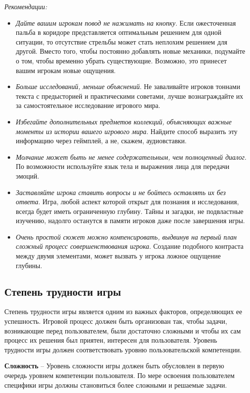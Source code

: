 \documentclass{article}
\begin{document}
\noindent\textit{Рекомендации:}
\begin{itemize}
  \item \textit{Дайте вашим игрокам повод не нажимать на кнопку}. Если ожесточенная пальба в коридоре представляется оптимальным решением для одной ситуации, то отсутствие стрельбы может стать неплохим решением для другой. Вместо того, чтобы постоянно добавлять новые механики, подумайте о том, чтобы временно убрать существующие. Возможно, это принесет вашим игрокам новые ощущения.
  \item \textit{Больше исследований, меньше объяснений}. Не заваливайте игроков тоннами текста с предысторией и практическими советами, лучше вознаграждайте их за самостоятельное исследование игрового мира.
  \item \textit{Избегайте дополнительных предметов коллекций, объясняющих важные моменты из истории вашего игрового мира}. Найдите способ выразить эту информацию через геймплей, а не, скажем, аудиовставки.
  \item \textit{Молчание может быть не менее содержательным, чем полноценный диалог}. По возможности используйте язык тела и выражения лица для передачи эмоций.
  \item \textit{Заставляйте игрока ставить вопросы и не бойтесь оставлять их без ответа}. Игра, любой аспект которой открыт для познания и исследования, всегда будет иметь ограниченную глубину. Тайны и загадки, не подвластные изучению, надолго останутся в памяти игроков даже после завершения игры.
  \item \textit{Очень простой сюжет можно компенсировать, выдвинув на первый план сложный процесс совершенствования игрока}. Создание подобного контраста между двумя элементами, может вызвать у игрока ложное ощущение глубины.
\end{itemize}

\subsection{Степень трудности игры}
Степень трудности игры является одним из важных факторов, определяющих ее успешность. Игровой процесс должен быть организован так, чтобы задачи, возникающие перед пользователем, были достаточно сложными и чтобы их сам процесс их решения был приятен, интересен для пользователя. Уровень трудности игры должен соответствовать уровню пользовательской компетенции.

\textbf{Сложность} -- Уровень сложности игры должен быть обусловлен в первую очередь уровнем компетенции пользователя. По мере освоения пользователем специфики игры должны становиться более сложными и решаемые задачи.
\end{document}
